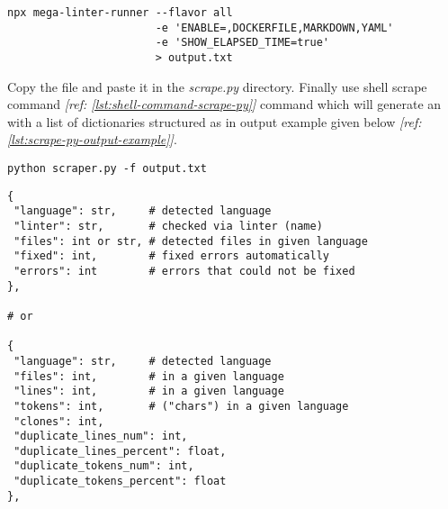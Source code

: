 \begin{lstlisting}[language=BashOwn, label={lst:shell-command-run-linter}, caption={"Running
\emph{Mega Linter}"}]
npx mega-linter-runner --flavor all
                       -e 'ENABLE=,DOCKERFILE,MARKDOWN,YAML'
                       -e 'SHOW_ELAPSED_TIME=true'
                       > output.txt
\end{lstlisting}

Copy the file and paste it in the \emph{scrape.py} directory. Finally use shell scrape command \textit{[ref: \ref{lst:shell-command-scrape-py}]} command which will generate an  with a list of dictionaries structured as in output example given below \textit{[ref: \ref{lst:scrape-py-output-example}]}.

\begin{lstlisting}[language=BashOwn, label={lst:shell-command-scrape-py}, caption={"Launching \code{scraper.py}"}]
python scraper.py -f output.txt
\end{lstlisting}

\begin{lstlisting}[language=PythonOwn, label={lst:scrape-py-output-example}, caption={"Parsed Linter Output in \code{.json} format"}]
{
 "language": str,     # detected language
 "linter": str,       # checked via linter (name)
 "files": int or str, # detected files in given language
 "fixed": int,        # fixed errors automatically
 "errors": int        # errors that could not be fixed
},

# or

{
 "language": str,     # detected language
 "files": int,        # in a given language
 "lines": int,        # in a given language
 "tokens": int,       # ("chars") in a given language
 "clones": int,
 "duplicate_lines_num": int,
 "duplicate_lines_percent": float,
 "duplicate_tokens_num": int,
 "duplicate_tokens_percent": float
},
\end{lstlisting}
